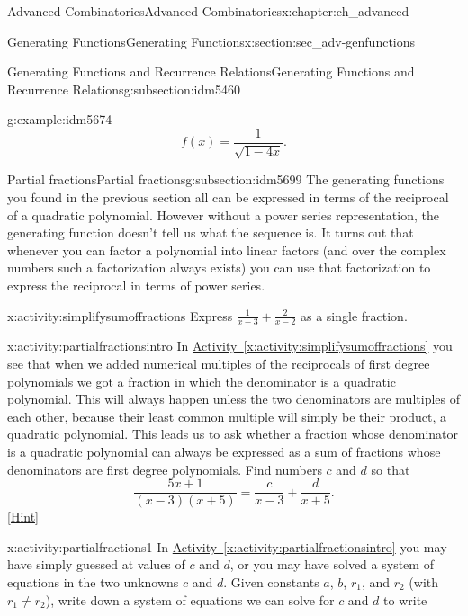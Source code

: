 \documentclass[oneside,10pt,]{book}
\numberwithin{equation}{chapter}
\begin{document}
\begin{chapterptx}{Advanced Combinatorics}{}{Advanced Combinatorics}{}{}{x:chapter:ch_advanced}
\begin{sectionptx}{Generating Functions}{}{Generating Functions}{}{}{x:section:sec_adv-genfunctions}
\begin{subsectionptx}{Generating Functions and Recurrence Relations}{}{Generating Functions and Recurrence Relations}{}{}{g:subsection:idm5460}
\begin{example}{}{g:example:idm5674}
\begin{equation*}
f(x) = \frac{1}{\sqrt{1-4x}}\text{.}
\end{equation*}
%
\end{example}
\end{subsectionptx}
%
%
\typeout{************************************************}
\typeout{************************************************}
%
\begin{subsectionptx}{Partial fractions}{}{Partial fractions}{}{}{g:subsection:idm5699}
The generating functions you found in the previous section all can be expressed in terms of the reciprocal of a quadratic polynomial. However without a power series representation, the generating function doesn't tell us what the sequence is. It turns out that whenever you can factor a polynomial into linear factors (and over the complex numbers such a factorization always exists) you can use that factorization to express the reciprocal in terms of power series.%
\begin{activity}{}{x:activity:simplifysumoffractions}%
Express \(\frac{1}{x-3} + \frac{2}{x-2}\) as a single fraction.%
\end{activity}
\begin{activity}{}{x:activity:partialfractionsintro}%
In \hyperref[x:activity:simplifysumoffractions]{Activity~\ref{x:activity:simplifysumoffractions}} you see that when we added numerical multiples of the reciprocals of first degree polynomials we got a fraction in which the denominator is a quadratic polynomial. This will always happen unless the two denominators are multiples of each other, because their least common multiple will simply be their product, a quadratic polynomial. This leads us to ask whether a fraction whose denominator is a quadratic polynomial can always be expressed as a sum of fractions whose denominators are first degree polynomials. Find numbers \(c\) and \(d\) so that%
\begin{equation*}
\frac{5x+1}{(x-3)(x+5)} = \frac{c}{x-3} + \frac{d}{x+5}.
\end{equation*}
%
\space\hspace*{0pt}\hfill{\tiny\hyperlink{g:hint:idm5716-back}{[Hint]}}\end{activity}
\begin{activity}{}{x:activity:partialfractions1}%
In \hyperref[x:activity:partialfractionsintro]{Activity~\ref{x:activity:partialfractionsintro}} you may have simply guessed at values of \(c\) and \(d\), or you may have solved a system of equations in the two unknowns \(c\) and \(d\). Given constants \(a\), \(b\), \(r_1\), and \(r_2\) (with \(r_1\not= r_2\)), write down a system of equations we can solve for \(c\) and \(d\) to write%

\end{activity}
\end{subsectionptx}
\end{sectionptx}
\end{chapterptx}
\end{document}
